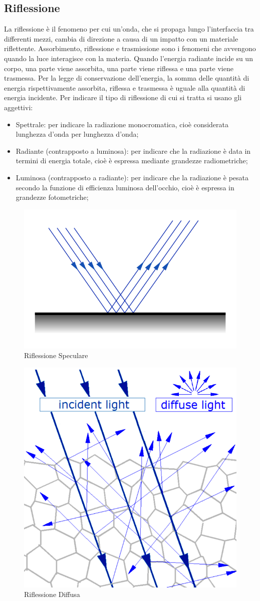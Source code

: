 \subsection{Riflessione}


La riflessione è il fenomeno per cui un'onda, che si propaga lungo l'interfaccia tra differenti mezzi, cambia di direzione a causa di un impatto con un materiale riflettente.
Assorbimento, riflessione e trasmissione sono i fenomeni che avvengono quando la luce interagisce con la materia. Quando l'energia radiante incide su un corpo, una parte viene assorbita, una parte viene riflessa e una parte viene trasmessa. Per la legge di conservazione dell'energia, la somma delle quantità di energia rispettivamente assorbita, riflessa e trasmessa è uguale alla quantità di energia incidente.
Per indicare il tipo di riflessione di cui si tratta si usano gli aggettivi:
\begin{itemize}
\item Spettrale: per indicare la radiazione monocromatica, cioè considerata lunghezza d'onda per lunghezza d'onda;
\item Radiante (contrapposto a luminosa): per indicare che la radiazione è data in termini di energia totale, cioè è espressa mediante grandezze radiometriche;
\item Luminosa (contrapposto a radiante): per indicare che la radiazione è pesata secondo la funzione di efficienza luminosa dell'occhio, cioè è espressa in grandezze fotometriche;
\end{itemize}


\begin{figure}[!h]
\centering
\includegraphics[width=.5\textwidth]{img/riflessione.png}
\caption{Riflessione Speculare}\label{fig:riflessione1}
\end{figure}


\begin{figure}[!h]
\centering
\includegraphics[width=.5\textwidth]{img/riflessione_diffusa.png}
\caption{Riflessione Diffusa}\label{fig:riflessione2}
\end{figure}

